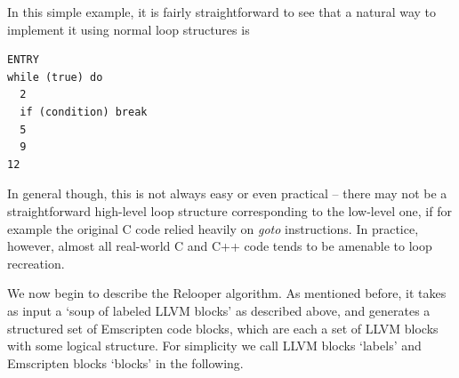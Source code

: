 \documentclass[preprint,10pt]{sigplanconf}
\begin{document}
In this simple example, it is fairly straightforward to see that a natural way to implement it
using normal loop structures is
\newpage
\begin{verbatim}
ENTRY
while (true) do
  2
  if (condition) break
  5
  9
12
\end{verbatim}
In general though, this is not always easy or even practical -- there may
not be a straightforward high-level loop structure corresponding to the low-level one, if
for example the original C code relied heavily on \emph{goto} instructions.
In practice, however, almost all real-world C and C++ code tends to
be amenable to loop recreation.

We now begin to describe the Relooper algorithm. As mentioned before, it takes as input a `soup of labeled LLVM blocks' as described above,
and generates a structured set of Emscripten code blocks, which are each a set of LLVM blocks
with some logical structure. For simplicity we call LLVM blocks `labels' and Emscripten
blocks `blocks' in the following.
\end{document}
